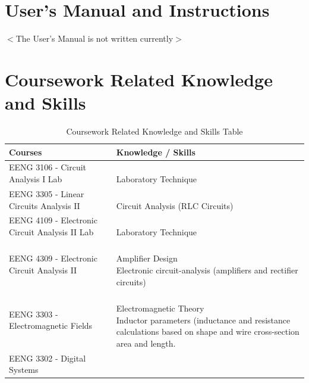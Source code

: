 \documentclass[12pt]{article}
\begin{document}
\begin{appendices}
\section{User's Manual and Instructions}

\begin{center}
$<$The User's Manual is not written currently$>$\\
\end{center}

\pagebreak

\section{Coursework Related Knowledge and Skills}

\begin{table}[h!]
\centering
\caption{Coursework Related Knowledge and Skills Table}
\begin{tabular}{ | l | l | }
\hline
\parbox{0.4\linewidth}{\centering
\textbf{Courses}
} &  \parbox{0.5\linewidth}{\centering
\textbf{Knowledge / Skills}
}\\
\hline
\parbox{0.4\linewidth}{\raggedleft
EENG 3106 - Circuit Analysis I Lab
} &   \parbox{0.5\linewidth}{\hfill \\
Laboratory Technique
}\\
\hline
\parbox{0.4\linewidth}{\raggedleft
EENG 3305 - Linear Circuits Analysis II
} &   \parbox{0.5\linewidth}{\hfill \\
Circuit Analysis (RLC Circuits)
}\\
\hline
\parbox{0.4\linewidth}{\raggedleft
EENG 4109 - Electronic Circuit Analysis II Lab
} &   \parbox{0.5\linewidth}{\hfill \\
Laboratory Technique
}\\
\hline
\parbox{0.4\linewidth}{\raggedleft
EENG 4309 - Electronic Circuit Analysis II
} &   \parbox{0.5\linewidth}{\hfill \\
Amplifier Design\\
Electronic circuit-analysis (amplifiers and rectifier circuits)
}\\
\hline
\parbox{0.4\linewidth}{\raggedleft
EENG 3303 - Electromagnetic Fields
} &   \parbox{0.5\linewidth}{\hfill \\
Electromagnetic Theory\\
Inductor parameters (inductance and resistance calculations based on shape and wire cross-section area and length.
}\\
\hline
\parbox{0.4\linewidth}{\raggedleft
EENG 3302 - Digital Systems
}
\end{tabular}
\end{table}
\end{appendices}
\end{document}
